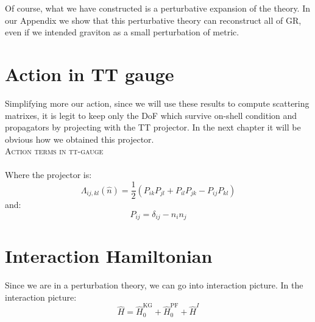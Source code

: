 \documentclass[12pt,a4paper]{article}
\begin{document}
 Of course, what we have constructed is a perturbative expansion of the theory. 
 In our Appendix we show that this perturbative theory can reconstruct all of GR, even if we intended graviton as a small perturbation of metric.

\section*{Action in TT gauge}
Simplifying more our action, since we will use these results to compute scattering matrixes, it is legit to keep only the DoF which survive on-shell condition and propagators by projecting with the TT projector. In the next chapter it will be obvious how we obtained this projector.\\

\vspace{0.5cm}
\textsc{Action terms in tt-gauge}\\

\\

Where the projector is:
\[
\Lambda_{ij,kl}(\hat{n}) = \frac{1}{2}\left(P_{ik}P_{jl} + P_{il}P_{jk} - P_{ij}P_{kl}\right)
\]
and:
\[
P_{ij}=\delta_{ij}-n_in_j
\]

\section{Interaction Hamiltonian}

Since we are in a perturbation theory, we can go into interaction picture. In the interaction picture:
\[
\hat{H} = \hat{H}_0^{\mathrm{KG}} + \hat{H}_0^{\mathrm{PF}} + \hat{H}^I
\]
\end{document}
